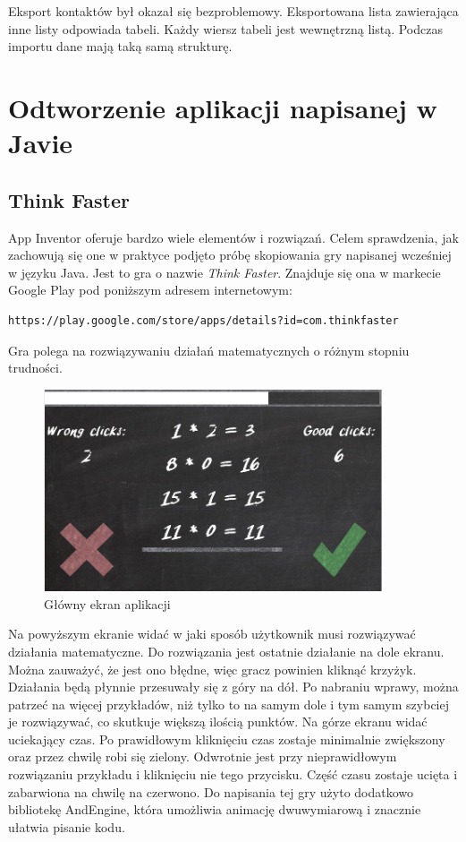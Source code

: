 Eksport kontaktów był okazał się bezproblemowy. Eksportowana lista zawierająca inne listy odpowiada tabeli. Każdy wiersz tabeli jest wewnętrzną listą. Podczas importu dane mają taką samą strukturę.

\section{Odtworzenie aplikacji napisanej w Javie}

\subsection{Think Faster}

App Inventor oferuje bardzo wiele elementów i rozwiązań. Celem sprawdzenia, jak zachowują się one w praktyce podjęto próbę skopiowania gry napisanej wcześniej w języku Java. Jest to gra o nazwie \emph{Think Faster}. Znajduje się ona w markecie Google Play pod poniższym adresem internetowym:

\begin{lstlisting}
https://play.google.com/store/apps/details?id=com.thinkfaster
\end{lstlisting} 

Gra polega na rozwiązywaniu działań matematycznych o różnym stopniu trudności. 

\begin{figure}[H]
\centering\includegraphics[width=10cm]{figures/apps/thinkfaster_newgame}
\caption{Główny ekran aplikacji}
\end{figure}

Na powyższym ekranie widać w jaki sposób użytkownik musi rozwiązywać działania matematyczne. Do rozwiązania jest ostatnie działanie na dole ekranu. Można zauważyć, że jest ono błędne, więc gracz powinien kliknąć krzyżyk. Działania będą płynnie przesuwały się z góry na dół. Po nabraniu wprawy, można patrzeć na więcej przykładów, niż tylko to na samym dole i tym samym szybciej je rozwiązywać, co skutkuje większą ilością punktów. Na górze ekranu widać uciekający czas. Po prawidłowym kliknięciu czas zostaje minimalnie zwiększony oraz przez chwilę robi się zielony. Odwrotnie jest przy nieprawidłowym rozwiązaniu przykładu i kliknięciu nie tego przycisku. Część czasu zostaje ucięta i zabarwiona na chwilę na czerwono. Do napisania tej gry użyto dodatkowo bibliotekę AndEngine, która umożliwia animację dwuwymiarową i znacznie ułatwia pisanie kodu.


